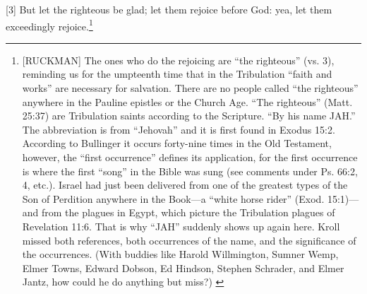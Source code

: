 [3] \textcolor[rgb]{0.00,0.00,1.00}{But let the righteous be glad; let them rejoice before God: yea, let them exceedingly rejoice.}\footnote{[RUCKMAN] The ones who do the rejoicing are “the righteous” (vs. 3), reminding us for the umpteenth time that in the Tribulation “faith and works” are necessary for salvation. There are no people called “the righteous” anywhere in the Pauline epistles or the Church Age. “The righteous” (Matt. 25:37) are Tribulation saints according to the Scripture. “By his name JAH.” The abbreviation is from “Jehovah” and it is first found in Exodus 15:2. According to Bullinger it occurs forty-nine times in the Old Testament, however, the “first occurrence” defines its application, for the first occurrence is where the first “song” in the Bible was sung (see comments under Ps. 66:2, 4, etc.). Israel had just been delivered from one of the greatest types of the Son of Perdition anywhere in the Book—a “white horse rider” (Exod. 15:1)— and from the plagues in Egypt, which picture the Tribulation plagues of Revelation 11:6. That is why “JAH” suddenly shows up again here. Kroll missed both references, both occurrences of the name, and the significance of the occurrences. (With buddies like Harold Willmington, Sumner Wemp, Elmer Towns, Edward Dobson, Ed Hindson, Stephen Schrader, and Elmer Jantz, how could he do anything but miss?)  \cite{Ruckman1992Psalms}  }
